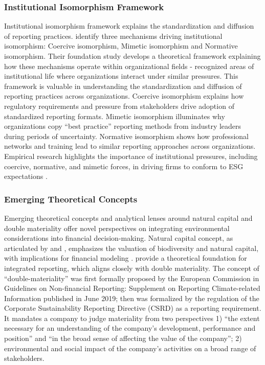\documentclass[
  authoryear]{elsarticle}
\begin{document}
\subsubsection{Institutional Isomorphism
Framework}\label{institutional-isomorphism-framework}

Institutional isomorphism framework explains the standardization and
diffusion of reporting practices. \citet{DIMAGGIO1983} identify three
mechanisms driving institutional isomorphism: Coercive isomorphism,
Mimetic isomorphism and Normative isomorphism. Their foundation study
develops a theoretical framework explaining how these mechanisms operate
within organizational fields - recognized areas of institutional life
where organizations interact under similar pressures. This framework is
valuable in understanding the standardization and diffusion of reporting
practices across organizations. Coercive isomorphism explains how
regulatory requirements and pressure from stakeholders drive adoption of
standardized reporting formats. Mimetic isomorphism illuminates why
organizations copy ``best practice'' reporting methods from industry
leaders during periods of uncertainty. Normative isomorphism shows how
professional networks and training lead to similar reporting approaches
across organizations. Empirical research highlights the importance of
institutional pressures, including coercive, normative, and mimetic
forces, in driving firms to conform to ESG expectations
\citep{DELMAS2004, HIGGINS2014, BEBBINGTON2018, CHRISTENSEN2021}.

\subsubsection{Emerging Theoretical
Concepts}\label{emerging-theoretical-concepts}

Emerging theoretical concepts and analytical lenses around natural
capital and double materiality offer novel perspectives on integrating
environmental considerations into financial decision-making. Natural
capital concept, as articulated by \citet{DASGUPTA2021} and
\citet{DAILY2009}, emphasizes the valuation of biodiversity and natural
capital, with implications for financial modeling \citep{ATKINSON2014}.
\citet{ECCLES2014} provide a theoretical foundation for integrated
reporting, which aligns closely with double materiality. The concept of
``double-materiality'' was first formally proposed by the European
Commission \citep{EC2019} in Guidelines on Non-financial Reporting:
Supplement on Reporting Climate-related Information published in June
2019; then was formalized by the regulation of the Corporate
Sustainability Reporting Directive (CSRD)\citep[see][]{EU_CSRD_2022} as
a reporting requirement. It mandates a company to judge materiality from
two perspectives 1) ``the extent necessary for an understanding of the
company's development, performance and position'' and ``in the broad
sense of affecting the value of the company''; 2) environmental and
social impact of the company's activities on a broad range of
stakeholders.
\end{document}
